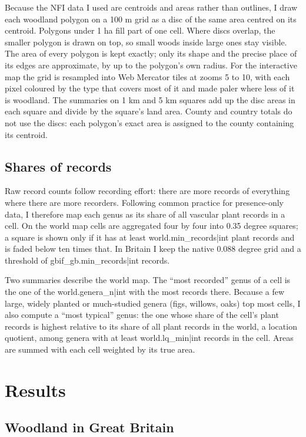 \documentclass[11pt,a4paper]{article}
\begin{document}
Because the NFI data I used are centroids and areas rather than outlines, I draw each woodland polygon on a 100 m grid as a disc of the same area centred on its centroid. Polygons under 1 ha fill part of one cell. Where discs overlap, the smaller polygon is drawn on top, so small woods inside large ones stay visible. The area of every polygon is kept exactly; only its shape and the precise place of its edges are approximate, by up to the polygon's own radius. For the interactive map the grid is resampled into Web Mercator tiles at zooms 5 to 10, with each pixel coloured by the type that covers most of it and made paler where less of it is woodland. The summaries on 1 km and 5 km squares add up the disc areas in each square and divide by the square's land area. County and country totals do not use the discs: each polygon's exact area is assigned to the county containing its centroid.

\subsection{Shares of records}

Raw record counts follow recording effort: there are more records of everything where there are more recorders. Following common practice for presence-only data, I therefore map each genus as its share of all vascular plant records in a cell. On the world map cells are aggregated four by four into 0.35 degree squares; a square is shown only if it has at least {{world.min_records|int}} plant records and is faded below ten times that. In Britain I keep the native 0.088 degree grid and a threshold of {{gbif_gb.min_records|int}} records.

Two summaries describe the world map. The ``most recorded'' genus of a cell is the one of the {{world.genera_n|int}} with the most records there. Because a few large, widely planted or much-studied genera (figs, willows, oaks) top most cells, I also compute a ``most typical'' genus: the one whose share of the cell's plant records is highest relative to its share of all plant records in the world, a location quotient, among genera with at least {{world.lq_min|int}} records in the cell. Areas are summed with each cell weighted by its true area.

\section{Results}

\subsection{Woodland in Great Britain}
\end{document}
